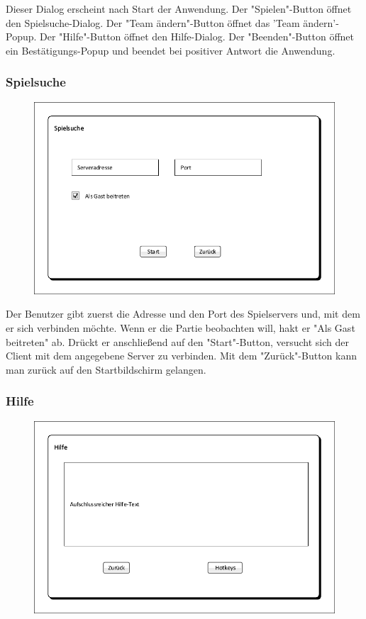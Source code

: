 Dieser Dialog erscheint nach Start der Anwendung. Der "Spielen"-Button öffnet den Spielsuche-Dialog. Der "Team ändern"-Button öffnet das 'Team ändern'-Popup. Der "Hilfe"-Button öffnet den Hilfe-Dialog. Der "Beenden"-Button öffnet ein Bestätigungs-Popup und beendet bei positiver Antwort die Anwendung.

\subsubsection{Spielsuche}
\begin{figure}[H]
	\centering
	\includegraphics[scale=0.8]{images/Spielsuche.pdf}
\end{figure}

Der Benutzer gibt zuerst die Adresse und den Port des Spielservers und, mit dem er sich verbinden möchte. Wenn er die Partie beobachten will, hakt er "Als Gast beitreten" ab. Drückt er anschließend auf den "Start"-Button, versucht sich der Client mit dem angegebene Server zu verbinden. Mit dem "Zurück"-Button kann man zurück auf den Startbildschirm gelangen.
	
\subsubsection{Hilfe}
\begin{figure}[H]
	\centering
	\includegraphics[scale=0.8]{images/Hilfe.pdf}
\end{figure}

